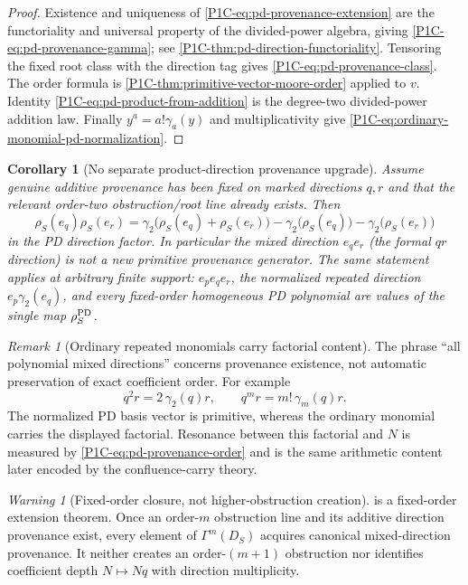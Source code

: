 \documentclass[11pt]{article}
\newtheorem{corollary}[theorem]{Corollary}
\theoremstyle{remark}
\newtheorem{remark}[theorem]{Remark}
\newtheorem{warning}[theorem]{Warning}
\begin{document}
\begin{proof}
Existence and uniqueness of \eqref{P1C-eq:pd-provenance-extension} are the functoriality and universal property of the divided-power algebra, giving \eqref{P1C-eq:pd-provenance-gamma}; see \cref{P1C-thm:pd-direction-functoriality}.  Tensoring the fixed root class with the direction tag gives \eqref{P1C-eq:pd-provenance-class}.  The order formula is \cref{P1C-thm:primitive-vector-moore-order} applied to $v$.  Identity \eqref{P1C-eq:pd-product-from-addition} is the degree-two divided-power addition law.  Finally $y^a=a!\gamma_a(y)$ and multiplicativity give \eqref{P1C-eq:ordinary-monomial-pd-normalization}.
\end{proof}

\begin{corollary}[No separate product-direction provenance upgrade]\label{P1C-cor:no-separate-product-provenance-upgrade}
Assume genuine additive provenance has been fixed on marked directions $q,r$ and that the relevant order-two obstruction/root line already exists.  Then
\[
 \boxed{
 \rho_S(e_q)\rho_S(e_r)
 =\gamma_2\bigl(\rho_S(e_q)+\rho_S(e_r)\bigr)
  -\gamma_2\bigl(\rho_S(e_q)\bigr)
  -\gamma_2\bigl(\rho_S(e_r)\bigr)}
\]
in the PD direction factor.  In particular the mixed direction $e_qe_r$ (the formal $qr$ direction) is not a new primitive provenance generator.  The same statement applies at arbitrary finite support: $e_pe_qe_r$, the normalized repeated direction $e_p\gamma_2(e_q)$, and every fixed-order homogeneous PD polynomial are values of the single map $\rho_S^{\rm PD}$.
\end{corollary}

\begin{remark}[Ordinary repeated monomials carry factorial content]\label{P1C-rem:ordinary-monomial-factorial-content}
The phrase ``all polynomial mixed directions'' concerns provenance existence, not automatic preservation of exact coefficient order.  For example
\[
 q^2r=2\,\gamma_2(q)r,
 \qquad
 q^mr=m!\,\gamma_m(q)r.
\]
The normalized PD basis vector is primitive, whereas the ordinary monomial carries the displayed factorial.  Resonance between this factorial and $N$ is measured by \eqref{P1C-eq:pd-provenance-order} and is the same arithmetic content later encoded by the confluence-carry theory.
\end{remark}

\begin{warning}[Fixed-order closure, not higher-obstruction creation]\label{P1C-warn:pd-provenance-fixed-order-only}
 is a fixed-order extension theorem.  Once an order-\(m\) obstruction line and its additive direction provenance exist, every element of \(\Gamma^m(D_S)\) acquires canonical mixed-direction provenance.  It neither creates an order-\((m+1)\) obstruction nor identifies coefficient depth \(N\mapsto Nq\) with direction multiplicity.
\end{warning}
\end{document}
